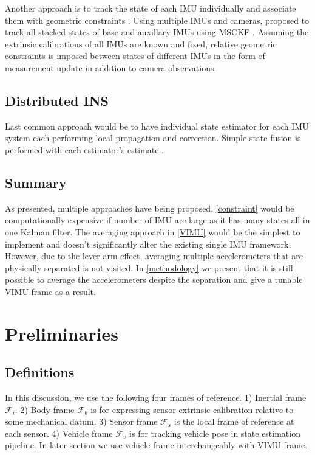 \documentclass[conference]{IEEEtran}
\begin{document}
Another approach is to track the state of each IMU individually and associate them with geometric constraints \cite{waegli2008, Beaudoin2018_satelite}. Using multiple IMUs and cameras, \cite{Eckenhoff2021_MIMC-VINS} proposed to track all stacked states of base and auxillary IMUs using MSCKF \cite{Anastasios2007_MSCKF}. Assuming the extrinsic calibrations of all IMUs are known and fixed, relative geometric constraints is imposed between states of different IMUs in the form of measurement update in addition to camera observations.

\subsection{Distributed INS}\label{distributed}

Last common approach would be to have individual state estimator for each IMU system each performing local propagation and correction. Simple state fusion is performed with each estimator's estimate \cite{Bancroft2011DataFA, patel2022_multi-imu}.

\subsection{Summary}

As presented, multiple approaches have being proposed. \ref{constraint} would be computationally expensive if number of IMU are large as it has many states all in one Kalman filter. The averaging approach in \ref{VIMU} would be the simplest to implement and doesn't significantly alter the existing single IMU framework. However, due to the lever arm effect, averaging multiple accelerometers that are physically separated is not visited. In \ref{methodology} we present that it is still possible to average the accelerometers despite the separation and give a tunable VIMU frame as a result.

\section{Preliminaries}

\subsection{Definitions}

In this discussion, we use the following four frames of reference. 1) Inertial frame $\bm{\mathcal{F}}_i$. 2) Body frame $\bm{\mathcal{F}}_b$ is for expressing sensor extrinsic calibration relative to some mechanical datum. 3) Sensor frame $\bm{\mathcal{F}}_s$ is the local frame of reference at each sensor. 4) Vehicle frame $\bm{\mathcal{F}}_v$ is for tracking vehicle pose in state estimation pipeline. In later section we use vehicle frame interchangeably with VIMU frame.
\end{document}

